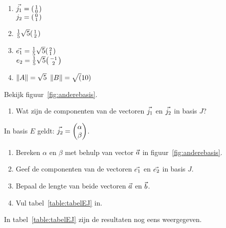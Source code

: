 \documentclass[../main.tex]{subfiles}
\begin{document}
\begin{antwoord}
\begin{enumerate}[left=-3pt]
\item $\vect{j_1}=\smqty(1\\0)$\\$j_2=\smqty(0\\1)$
\item $\frac{1}{5}\sqrt{5}\smqty(1\\2)$
\item $\vect{e_1}=\frac{1}{5}\sqrt{5}\smqty(2\\1)$\\$ e_2=\frac{1}{5}\sqrt{5}\smqty(-1\\2)$
\item $\norm{A}=\sqrt{5}$    $\norm{B}=\sqrt(10)$
\end{enumerate}
\end{antwoord}
\begin{opdracht}[red]%
Bekijk figuur~\ref{fig:anderebasis}.
\begin{enumerate}[noitemsep]
\item Wat zijn de componenten van de vectoren $\vec{j_1}$ en $\vec{j_2}$ in basis $J$?
\end{enumerate}
In basis $E$ geldt: $\vect{j_2} =\mqty(\alpha\\\beta)$. 
\begin{enumerate}
\item Bereken $\alpha$ en $\beta$ met behulp van vector $\vec{a}$ in figuur~\ref{fig:anderebasis}.
\item Geef de componenten van de vectoren $\vec{e_1}$ en $\vec{e_2}$ in basis $J$.
\item Bepaal de lengte van beide vectoren $\vec{a}$ en $\vec{b}$.
\item Vul tabel~\ref{table:tabelEJ} in.
\end{enumerate}
\end{opdracht}
In tabel~\ref{table:tabelEJ} zijn de resultaten nog eens weergegeven. 
\end{document}

